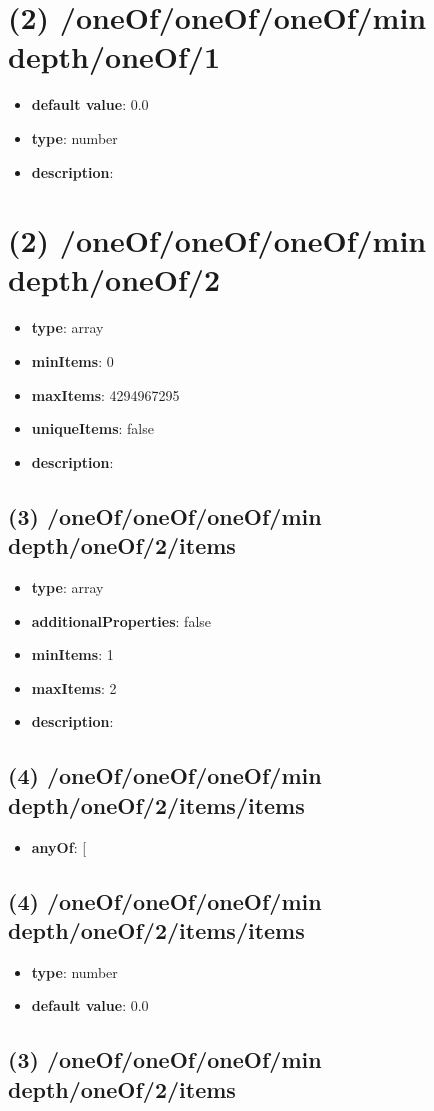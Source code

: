 \section{(2) /oneOf/oneOf/oneOf/min depth/oneOf/1}
\begin{itemize}[leftmargin=2em]\item {\bf default value}: 0.0
\item {\bf type}: number
\item {\bf description}: 
\end{itemize}\section{(2) /oneOf/oneOf/oneOf/min depth/oneOf/2}
\begin{itemize}[leftmargin=2em]\item {\bf type}: array
\item {\bf minItems}: 0
\item {\bf maxItems}: 4294967295
\item {\bf uniqueItems}: false
\item {\bf description}: 
\end{itemize}\subsection{(3) /oneOf/oneOf/oneOf/min depth/oneOf/2/items}
\begin{itemize}[leftmargin=3em]\item {\bf type}: array
\item {\bf additionalProperties}: false
\item {\bf minItems}: 1
\item {\bf maxItems}: 2
\item {\bf description}: 
\end{itemize}\subsection{(4) /oneOf/oneOf/oneOf/min depth/oneOf/2/items/items}
\begin{itemize}[leftmargin=4em]\item {\bf anyOf}: [\end{itemize}\subsection{(4) /oneOf/oneOf/oneOf/min depth/oneOf/2/items/items}
\begin{itemize}[leftmargin=4em]\item {\bf type}: number\item {\bf default value}: 0.0
\end{itemize}\subsection{(3) /oneOf/oneOf/oneOf/min depth/oneOf/2/items}
